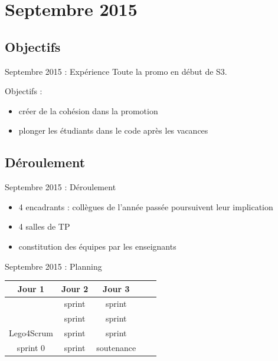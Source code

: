 \documentclass{beamer}
\begin{document}
\section{Septembre 2015}
\subsection{Objectifs}
\begin{frame}{Septembre 2015 : Expérience}
  Toute la promo en début de S3.

  Objectifs : 
  \begin{itemize}
    \item créer de la cohésion dans la promotion
    \item plonger les étudiants dans le code après les vacances
  \end{itemize}
\end{frame}

\subsection{Déroulement}
\begin{frame}{Septembre 2015 : Déroulement}
  \begin{itemize}
    \item 4 encadrants : collègues de l'année passée poursuivent leur implication
    \item 4 salles de TP
    \item constitution des équipes par les enseignants
  \end{itemize}
\end{frame}

\begin{frame}{Septembre 2015 : Planning}
  \begin{center}
    \begin{tabular}{| c | c | c || c | c |}
      \hline
      \textbf{Jour 1} & \textbf{Jour 2} & \textbf{Jour 3}  \\
      \hline \hline
                      & sprint          & sprint           \\
      \hline
                      & sprint          & sprint           \\
      \hline \hline
      Lego4Scrum      & sprint          & sprint           \\
      \hline
      sprint 0        & sprint          & soutenance       \\
      \hline
    \end{tabular}
  \end{center}
\end{frame}
\end{document}
